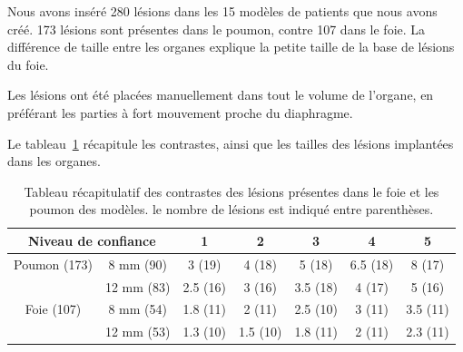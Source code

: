 Nous avons inséré 280 lésions dans les 15 modèles de patients que nous avons créé. 173 lésions sont présentes dans le poumon, contre 107 dans le foie. La différence de taille entre les organes explique la petite taille de la base de lésions du foie. 

Les lésions ont été placées manuellement dans tout le volume de l'organe, en préférant les parties à fort mouvement proche du diaphragme. 

Le tableau~\ref{tab:contrastePoumonFoieRecap} récapitule les contrastes, ainsi que les tailles des lésions implantées dans les organes.
 
\begin{table}
\centering
 \begin{tabular}{|c|c||c|c|c|c|c|} 
\hline
\multicolumn{2}{|c|}{Niveau de confiance}       & 1	  & 2	    & 3	     & 4	& 5	\\
\hline
\hline
Poumon	(173)	& 8 mm (90)	& 3 (19)  & 4 (18)  & 5 (18)  & 6.5 (18)	& 8 (17)\\
\cline{2-7}
		& 12 mm	(83)	& 2.5 (16)& 3 (16)  & 3.5 (18)& 4 (17)	& 5 (16)\\
\hline
Foie 	(107)	& 8 mm (54)		& 1.8 (11)& 2 (11)  & 2.5 (10)& 3 (11)	& 3.5 (11)\\
\cline{2-7}
		& 12 mm	(53)	& 1.3 (10)& 1.5 (10)& 1.8 (11)& 2 (11)  & 2.3 (11)\\
\hline 
 \end{tabular}

\caption[Tableau récapitulatif des lésions]{Tableau récapitulatif des contrastes des lésions présentes dans le foie et les poumon des modèles. le nombre de lésions est indiqué entre parenthèses.}
\label{tab:contrastePoumonFoieRecap}


\end{table}



